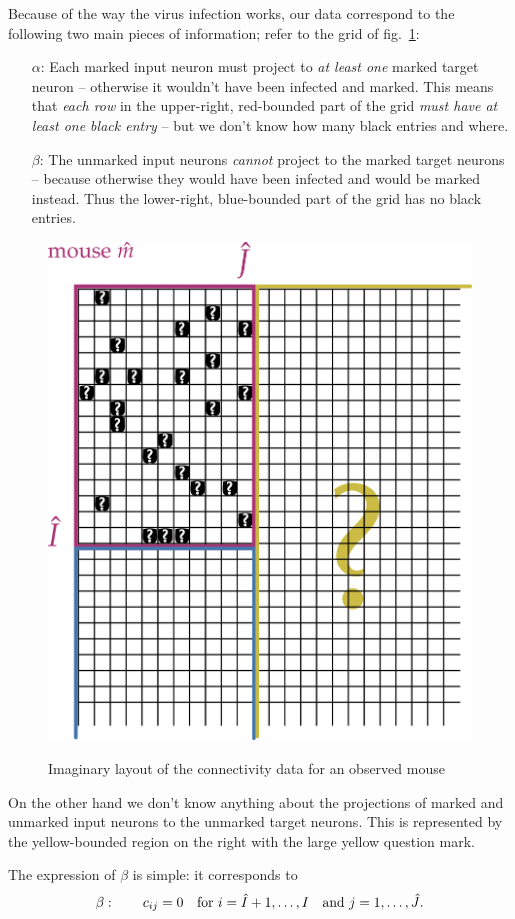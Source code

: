 \documentclass[\ifafour a4paper,12pt,\else a5paper,10pt,\fi%
onecolumn,oneside,article,%
british%
]{memoir}
\theoremstyle{remark}
\theoremstyle{innote}
\renewcommand*{\|}[1][]{\nonscript\,#1\vert\nonscript\;\mathopen{}}
\newcommand*{\fig}{fig.}%
\newcommand*{\yIh}{\Hat{I}}
\newcommand*{\yJh}{\Hat{J}}
\newcommand*{\ka}{\alpha}
\newcommand*{\kb}{\beta}
\begin{document}
Because of the way the virus infection works, our data correspond to the
following two main pieces of information; refer to the grid of
\fig~\ref{fig:datamouse}:
\begin{itemize}
\item[\textcolor{myred}{$\ka$}:] Each marked input neuron must project to
  \emph{at least one} marked target neuron -- otherwise it wouldn't have
  been infected and marked. This means that \emph{each row} in the
  upper-right, \textcolor{myred}{red-bounded} part of the grid \emph{must
    have at least one black entry} -- but we don't know how many black
  entries and where.
\item[\textcolor{mypurpleblue}{$\kb$}:] The unmarked input neurons
  \emph{cannot} project to the marked target neurons -- because otherwise
  they would have been infected and would be marked instead. Thus the
  lower-right, \textcolor{mypurpleblue}{blue-bounded} part of the grid has
  no black entries.
\end{itemize}
\begin{figure}[t!]%
 \centering\includegraphics[width=0.5\linewidth]{data_mouse2.png}\\
 \caption{Imaginary layout of the connectivity data for an observed mouse}\label{fig:datamouse}
\end{figure}%
On the other hand we don't know anything about the projections of marked
and unmarked input neurons to the unmarked target neurons. This is
represented by the \textcolor{myyellow}{yellow-bounded} region on the right
with the large yellow question mark.

The expression of $\kb$ is simple: it corresponds to
\begin{equation}
  \label{eq:alpha_and}
\kb:\qquad  c_{ij} =0 \quad\text{for }i=\yIh+1,\dotsc, I
  \quad\text{and }j=1,\dotsc,\yJh.
\end{equation}
\end{document}
